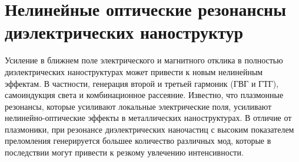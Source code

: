 \section{Нелинейные оптические резонансны диэлектрических наноструктур}
\hspace*{2mm}
Усиление в ближнем поле электрического и магнитного отклика в полностью диэлектрических наноструктурах может привести к новым нелинейным эффектам. В частности, генерация второй и третьей гармоник (ГВГ и ГТГ), самоиндукция света и комбинационное рассеяние. Известно, что плазмонные резонансы, которые усиливают локальные электрические поля, усиливают нелинейно-оптические эффекты в металлических наноструктурах. В отличие от плазмоники, при резонансе диэлектрических наночастиц с высоким показателем преломления генерируется большее количество различных мод, которые в последствии могут привести к резкому увлечению интенсивности.

